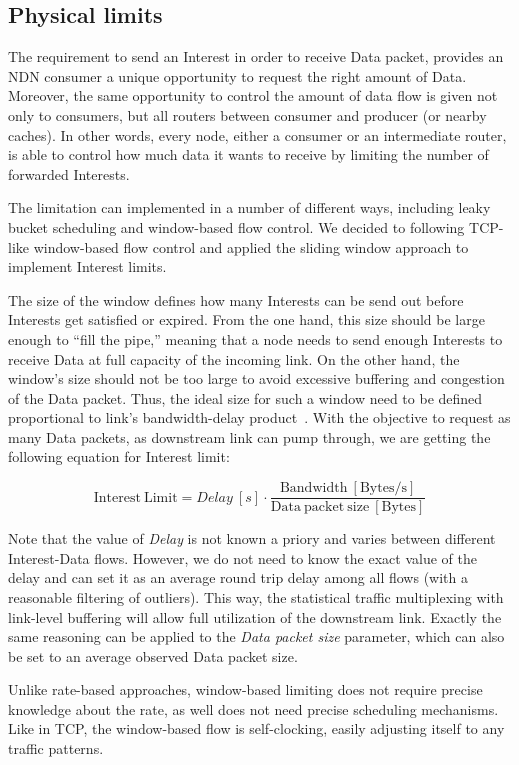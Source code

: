 \subsection{Physical limits}

The requirement to send an Interest in order to receive Data packet, provides an NDN consumer a unique opportunity to request the right amount of Data.
Moreover, the same opportunity to control the amount of data flow is given not only to consumers, but all routers between consumer and producer (or nearby caches).  
In other words, every node, either a consumer or an intermediate router, is able to control how much data it wants to receive by limiting the number of forwarded Interests.

The limitation can implemented in a number of different ways, including leaky bucket scheduling and window-based flow control.
We decided to following TCP-like window-based flow control and applied the sliding window approach to implement Interest limits.

The size of the window defines how many Interests can be send out before Interests get satisfied or expired.
From the one hand, this size should be large enough to ``fill the pipe,'' meaning that a node needs to send enough Interests to receive Data at full capacity of the incoming link.
On the other hand, the window's size should not be too large to avoid excessive buffering and congestion of the Data packet.
Thus, the ideal size for such a window need to be defined proportional to link's bandwidth-delay product~\cite{tcp-survey}.
With the objective to request as many Data packets, as downstream link can pump through, we are getting the following equation for Interest limit:

\[
\mathrm{Interest\ Limit} = Delay\ [s] \cdot \frac{\mathrm{Bandwidth\ [Bytes/s]}}{\mathrm{Data\ packet\ size\ [Bytes]}}
\]

Note that the value of \textit{Delay} is not known a priory and varies between different Interest-Data flows.
However, we do not need to know the exact value of the delay and can set it as an average round trip delay among all flows (with a reasonable filtering of outliers).
This way, the statistical traffic multiplexing with link-level buffering will allow full utilization of the downstream link.
Exactly the same reasoning can be applied to the \textit{Data packet size} parameter, which can also be set to an average observed Data packet size.

Unlike rate-based approaches, window-based limiting does not require precise knowledge about the rate, as well does not need precise scheduling mechanisms.
Like in TCP, the window-based flow is self-clocking, easily adjusting itself to any traffic patterns.

